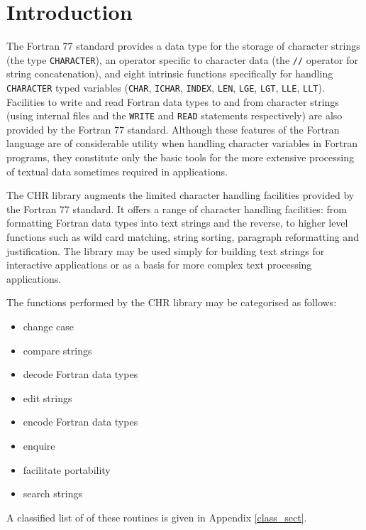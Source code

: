 \documentclass[twoside,11pt,nolof]{starlink}
\begin{document}
\scfrontmatter

\section {Introduction}

The Fortran 77 standard provides a data type for the storage of
character strings (the type \texttt{CHARACTER}), an operator specific to
character data (the \texttt{//} operator for string concatenation), and
eight intrinsic functions specifically for handling \texttt{CHARACTER} typed
variables (\texttt{CHAR}, \texttt{ICHAR}, \texttt{INDEX}, \texttt{LEN}, \texttt{LGE},
\texttt{LGT}, \texttt{LLE}, \texttt{LLT}).
Facilities to write and read Fortran data types to and from
character strings (using internal files and the \texttt{WRITE} and \texttt{READ}
statements respectively) are also provided by the Fortran 77 standard.
Although these features of the Fortran language are of considerable utility
when handling character variables in Fortran programs, they constitute only the
basic tools for the more extensive processing of textual data sometimes
required in applications.

The CHR library augments the limited character handling facilities
provided by the Fortran 77 standard.
It offers a range of character handling facilities: from formatting
Fortran data types into text strings and the reverse, to higher level
functions such as wild card matching, string sorting, paragraph
reformatting and justification.
The library may be used simply for building text strings for interactive
applications or as a basis for more complex text processing applications.

The functions performed by the CHR library may be categorised as follows:

\begin{itemize}
\item change case
\item compare strings
\item decode Fortran data types
\item edit strings
\item encode Fortran data types
\item enquire
\item facilitate portability
\item search strings
\end{itemize}

A classified list of of these routines is given in Appendix \ref{class_sect}.
\end{document}
